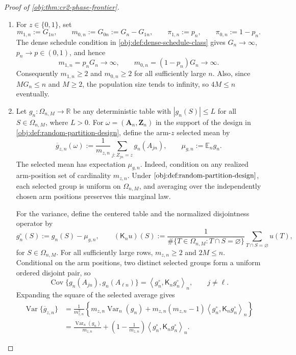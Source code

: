 \begin{proof}[Proof of \cref{obj:thm:cr2-phase-frontier}]
\begin{enumerate}
\item For \(z\in\{0,1\}\), set
\[
m_{1,n}:=G_{1n},\qquad m_{0,n}:=G_{0n}:=G_n-G_{1n},
\qquad
\pi_{1,n}:=p_n,\qquad \pi_{0,n}:=1-p_n .
\]
The dense schedule condition in \cref{obj:def:dense-schedule-class} gives \(G_n\to\infty\), \(p_n\to p\in(0,1)\), and hence
\[
m_{1,n}=p_nG_n\to\infty,
\qquad
m_{0,n}=(1-p_n)G_n\to\infty .
\]
Consequently \(m_{1,n}\ge2\) and \(m_{0,n}\ge2\) for all sufficiently large \(n\). Also, since \(MG_n\le n\) and \(M\ge2\), the population size tends to infinity, so \(4M\le n\) eventually. %

\item Let \(g_n:\Omega_{n,M}\to\mathbb R\) be any deterministic table with \(|g_n(S)|\le L\) for all \(S\in\Omega_{n,M}\), where \(L>0\). For \(\omega=(\mathbf A_n,\mathbf Z_n)\) in the support of the design in \cref{obj:def:random-partition-design}, define the arm-\(z\) selected mean by
\[
\overline g_{z,n}(\omega)
:=
\frac{1}{m_{z,n}}\sum_{j:Z_{jn}=z} g_n(A_{jn}),
\qquad
\mu_{g,n}:=\mathbb E_n g_n .
\]
The selected mean has expectation \(\mu_{g,n}\). Indeed, condition on any realized arm-position set of cardinality \(m_{z,n}\). Under \(\cref{obj:def:random-partition-design}\), each selected group is uniform on \(\Omega_{n,M}\), and averaging over the independently chosen arm positions preserves this marginal law.

For the variance, define the centered table and the normalized disjointness operator by
\[
g_{n}^{\circ}(S):=g_n(S)-\mu_{g,n},
\qquad
(\mathsf K_n u)(S)
:=
\frac{1}{\#\{T\in\Omega_{n,M}:T\cap S=\varnothing\}}
\sum_{T\cap S=\varnothing}u(T),
\]
for \(S\in\Omega_{n,M}\). For all sufficiently large rows, \(m_{z,n}\ge2\) and \(2M\le n\). Conditional on the arm positions, two distinct selected groups form a uniform ordered disjoint pair, so
\[
\operatorname{Cov}\{g_n(A_{jn}),g_n(A_{\ell n})\}
=
\left\langle g_{n}^{\circ},\mathsf K_n g_{n}^{\circ}\right\rangle_n,
\qquad j\ne\ell .
\]
Expanding the square of the selected average gives
\[
\begin{aligned}
\operatorname{Var}\{\overline g_{z,n}\}
&=
\frac{1}{m_{z,n}^2}
\left\{
 m_{z,n}\operatorname{Var}_n(g_n)
 +m_{z,n}(m_{z,n}-1)
 \left\langle g_{n}^{\circ},\mathsf K_n g_{n}^{\circ}\right\rangle_n
\right\} \\
&=
\frac{\operatorname{Var}_n(g_n)}{m_{z,n}}
+
\left(1-\frac{1}{m_{z,n}}\right)
\left\langle g_{n}^{\circ},\mathsf K_n g_{n}^{\circ}\right\rangle_n .
\end{aligned}
\]


\end{enumerate}
\end{proof}
